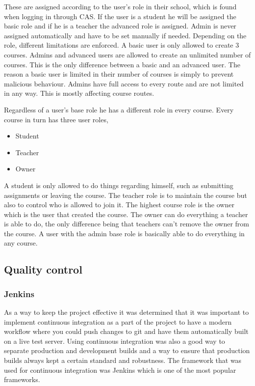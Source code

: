 These are assigned according to the user's role in their school, which is found when logging in through CAS. If the user is a student he will be assigned the basic role and if he is a teacher the advanced role is assigned. Admin is never assigned automatically and have to be set manually if needed. Depending on the role, different limitations are enforced. A basic user is only allowed to create 3 courses. Admins and advanced users are allowed to create an unlimited number of courses. This is the only difference between a basic and an advanced user. The reason a basic user is limited in their number of courses is simply to prevent malicious behaviour. Admins have full access to every route and are not limited in any way. This is mostly affecting course routes. 

Regardless of a user's base role he has a different role in every course. Every course in turn has three user roles,
\begin{itemize}
\item Student
\item Teacher
\item Owner
\end{itemize}
A student is only allowed to do things regarding himself, such as submitting assignments or leaving the course. The teacher role is to maintain the course but also to control who is allowed to join it. The highest course role is the owner which is the user that created the course. The owner can do everything a teacher is able to do, the only difference being that teachers can't remove the owner from the course. A user with the admin base role is basically able to do everything in any course.

\subsection{Quality control}
\subsubsection{Jenkins}
As a way to keep the project effective it was determined that it was important to implement continuous integration as a part of the project to have a modern workflow where you could push changes to git and have them automatically built on a live test server. Using continuous integration was also a good way to separate production and development builds and a way to ensure that production builds always kept a certain standard and robustness. The framework that was used for continuous integration was Jenkins which is one of the most popular frameworks.

